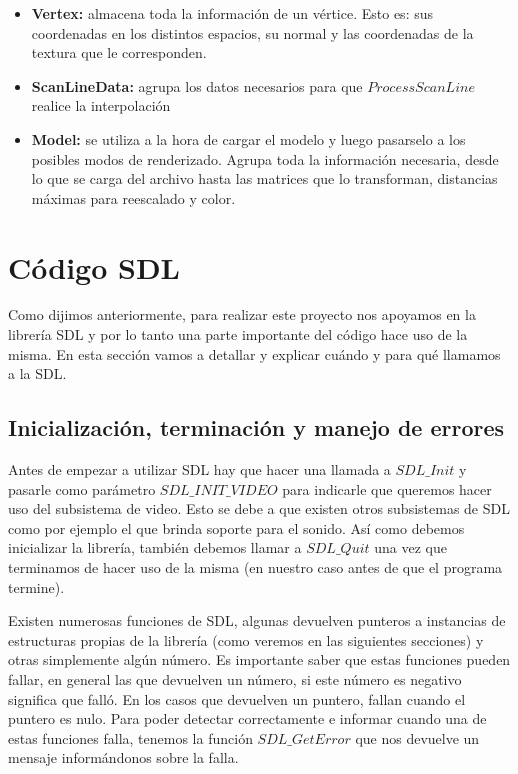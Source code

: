 \documentclass[a4paper]{article}
\newcounter{col}
\begin{document}
\begin{itemize}
\item \textbf{Vertex: } almacena toda la información de un vértice. Esto es: sus coordenadas en los distintos espacios, su normal y las coordenadas de la textura que le corresponden.
\item \textbf{ScanLineData:} agrupa los datos necesarios para que $ProcessScanLine$ realice la interpolación
\item \textbf{Model:} se utiliza a la hora de cargar el modelo y luego pasarselo a los posibles modos de renderizado. Agrupa toda la información necesaria, desde lo que se carga del archivo hasta las matrices que lo transforman, distancias máximas para reescalado y color.
\end{itemize}

\section{Código SDL}
Como dijimos anteriormente, para realizar este proyecto nos apoyamos en la librería SDL y por lo tanto una parte importante del código hace uso de la misma. En esta sección vamos a detallar y explicar cuándo y para qué llamamos a la SDL.


\subsection{Inicialización, terminación y manejo de errores}
Antes de empezar a utilizar SDL hay que hacer una llamada a $SDL\_Init$ y pasarle como parámetro $SDL\_INIT\_VIDEO$ para indicarle que queremos hacer uso del subsistema de video. Esto se debe a que existen otros subsistemas de SDL como por ejemplo el que brinda soporte para el sonido. Así como debemos inicializar la librería, también debemos llamar a $SDL\_Quit$ una vez que terminamos de hacer uso de la misma (en nuestro caso antes de que el programa termine).
\par Existen numerosas funciones de SDL, algunas devuelven punteros a instancias de estructuras propias de la librería (como veremos en las siguientes secciones) y otras simplemente algún número. Es importante saber que estas funciones pueden fallar, en general las que devuelven un número, si este número es negativo significa que falló. En los casos que devuelven un puntero, fallan cuando el puntero es nulo. Para poder detectar correctamente e informar cuando una de estas funciones falla, tenemos la función $SDL\_GetError$ que nos devuelve un mensaje informándonos sobre la falla.
\end{document}
